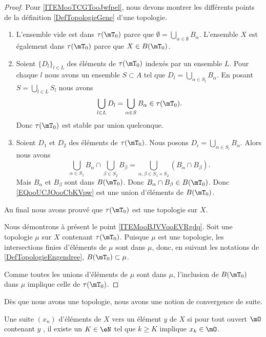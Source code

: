 \begin{proof}
	Pour \ref{ITEMooTCGTooJwfpel}, nous devons montrer les différents points de la définition \ref{DefTopologieGene} d'une topologie.
	\begin{enumerate}
		\item
		      L'ensemble vide est dans \( \tau(\mT_0)\) parce que \( \emptyset=\bigcup_{\alpha\in \emptyset}B_{\alpha}\). L'ensemble \( X\) est également dans \( \tau(\mT_0)\) parce que \( X\in B(\mT_0)\).

		\item
		      Soient \( \{ D_l \}_{l\in L}\) des éléments de \( \tau(\mT_0)\) indexés par un ensemble \( L\). Pour chaque \( l\) nous avons un ensemble \( S\subset A\) tel que \( D_l=\bigcup_{\alpha\in S_l}B_{\alpha}\). En posant \( S=\bigcup_{l\in L}S_l\) nous avons
		      \begin{equation}
			      \bigcup_{l\in L} D_l=\bigcup_{\alpha\in S}B_{\alpha}\in \tau(\mT_0).
		      \end{equation}
		      Donc \( \tau(\mT_0)\) est stable par union quelconque.
		\item
		      Soient \( D_1\) et \( D_2\) des éléments de \( \tau(\mT_0)\). Nous posons \( D_i=\bigcup_{\alpha\in S_i}B_{\alpha}\). Alors nous avons
		      \begin{equation}        \label{EQooUCJOooCbKVpw}
			      \bigcup_{\alpha\in S_1}B_{\alpha}\cap\bigcup_{\beta\in S_2}B_{\beta}=\bigcup_{\alpha,\beta\in S_1\times S_2}(B_{\alpha}\cap B_{\beta}).
		      \end{equation}
		      Mais \( B_{\alpha}\) et \( B_{\beta}\) sont dans \( B(\mT_0)\). Donc \( B_{\alpha}\cap B_{\beta}\in B(\mT_0)\). Donc \eqref{EQooUCJOooCbKVpw} est une union d'éléments de \( B(\mT_0)\).
	\end{enumerate}
	Au final nous avons prouvé que \( \tau(\mT_0)\) est une topologie sur \( X\).

	Nous démontrons à présent le point \ref{ITEMooBJVVooEVRgdq}. Soit une topologie \( \mu\) sur \( X\) contenant \( \tau(\mT_0)\). Puisque \( \mu\) est une topologie, les intersections finies d'éléments de \( \mu\) sont dans \( \mu\), donc, en suivant les notations de \ref{DefTopologieEngendree}, \( B(\mT_0)\subset \mu\).

	Comme toutes les unions d'éléments de \( \mu\) sont dans \( \mu\), l'inclusion de \( B(\mT_0)\) dans \( \mu\) implique celle de \( \tau(\mT_0)\).
\end{proof}


Dès que nous avons une topologie, nous avons une notion de convergence de suite.
\begin{definition} \label{DefXSnbhZX}
	Une suite \( (x_n)\) d'éléments de \( X\)  vers un élément \( y\) de \( X\) si pour tout ouvert \(\mO \)  contenant \( y\) , il existe un \( K\in \eN\) tel que \( k\geq K\) implique \( x_k\in\mO\).
\end{definition}

